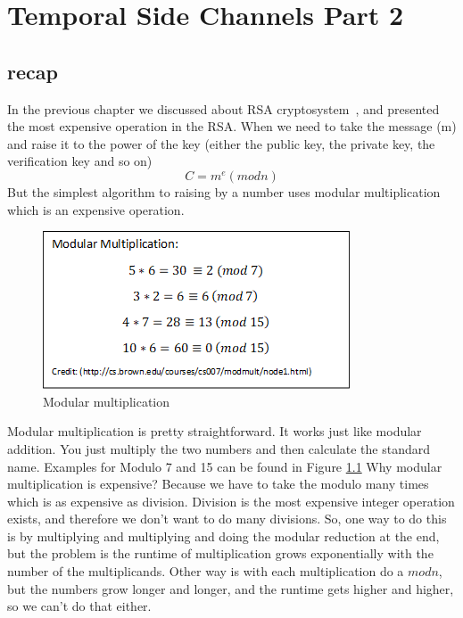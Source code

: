 \chapter{Temporal Side Channels Part 2} \label{c1_firstchapter:cha}

\section{recap}\label{c1_basicformatting:sec}

In the previous chapter we discussed about RSA cryptosystem~\cite{wikiRSA}, and presented  the most expensive operation in the RSA. When we need to take the message (m) and raise it to the power of the key (either the public key, the private key, the verification key and so on)
\[ C = m^e(modn) \]
But the simplest algorithm to raising by a number uses modular multiplication which is an expensive operation.
\begin{figure}[H]
    \centering
    \includegraphics{images/modmul.png}
    \caption{Modular multiplication} \label{modmul:fig}
\end{figure}
Modular multiplication is pretty straightforward. It works just like modular addition. You just multiply the two numbers and then calculate the standard name. Examples for Modulo 7 and 15 can be found in Figure \ref{modmul:fig} 
Why modular multiplication is expensive? Because we have to take the modulo many times which is as expensive as division. Division is the most expensive integer operation exists, and  therefore we don’t want to do many divisions. So, one way to do this is by multiplying and multiplying and doing the modular reduction at the end, but the problem is the runtime of multiplication grows exponentially with the number of the multiplicands. 
Other way is with each multiplication do a  \( mod n \), but the numbers grow longer and longer, and the runtime gets higher and higher, so we can’t do that either. 
